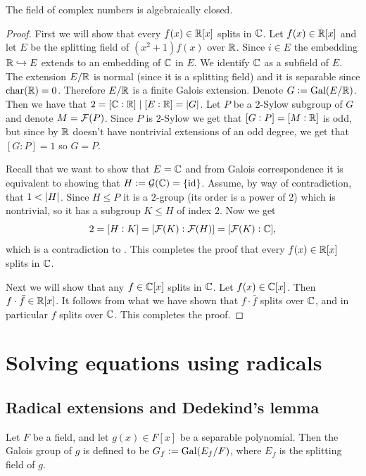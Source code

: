\documentclass[11pt,a4paper]{article}
\begin{document}
\begin{theorem}
  The field of complex numbers is algebraically closed.
\end{theorem}
\begin{proof}
  First we will show that every $f(x) \in \mathbb{R}[x]$ splits in $\mathbb{C}$.
  Let $f(x) \in \mathbb{R}[x]$ and let $E$ be the splitting field of
  $(x^2 + 1) f(x)$ over $\mathbb{R}$.
  Since $i \in E$ the embedding $\mathbb{R} \hookrightarrow E$ extends
  to an embedding of $\mathbb{C}$ in $E$.
  We identify $\mathbb{C}$ as a subfield of $E$.
  The extension $E/\mathbb{R}$ is normal (since it is a splitting field)
  and it is separable since $\text{char}(\mathbb{R}) = 0$.
  Therefore $E/\mathbb{R}$ is a finite Galois extension.
  Denote $G := \operatorname{Gal}(E/\mathbb{R})$.
  Then we have that $2 = [\mathbb{C} : \mathbb{R}] \mid [E : \mathbb{R}] = \left\lvert G\right\rvert$.
  Let $P$ be a $2$-Sylow subgroup of $G$ and denote $M = \mathcal F(P)$.
  Since $P$ is $2$-Sylow we get that $[G : P] = [M : \mathbb{R}]$ is odd,
  but since by  $\mathbb{R}$
  doesn't have nontrivial extensions of an odd degree,
  we get that $[G : P] = 1$ so $G = P$.

  Recall that we want to show that $E = \mathbb{C}$
  and from Galois correspondence it is equivalent
  to showing that $H := \mathcal G(\mathbb{C}) = \left\{\operatorname{id}\right\}$.
  Assume, by way of contradiction, that $1 < \left\lvert H\right\rvert$.
  Since $H \leqslant P$ it is a $2$-group (its order is a power of $2$)
  which is nontrivial, so it has a subgroup $K \leqslant H$ of index $2$.
  Now we get
  \[
    2 = [H : K] =
    [\mathcal F(K) : \mathcal F(H)] =
    [\mathcal F(K) : \mathbb{C}],
  \]
  which is a contradiction to .
  This completes the proof that every $f(x) \in \mathbb{R}[x]$ splits in $\mathbb{C}$.

  Next we will show that any $f \in \mathbb{C}[x]$ splits in $\mathbb{C}$.
  Let $f(x) \in \mathbb{C}[x]$.
  Then $f \cdot \bar f \in \mathbb{R}[x]$.
  It follows from what we have shown that $f \cdot \bar f$ splits over $\mathbb{C}$,
  and in particular $f$ splits over $\mathbb{C}$.
  This completes the proof.
\end{proof}

\newpage

\section{Solving equations using radicals}
\subsection{Radical extensions and Dedekind's lemma}
\begin{definition}
  Let $F$ be a field,
  and let $g(x) \in F[x]$ be a separable polynomial.
  Then the Galois group of $g$ is defined to be $G_f := \operatorname{Gal}(E_f/F)$,
  where $E_f$ is the splitting field of $g$.
\end{definition}
\end{document}
